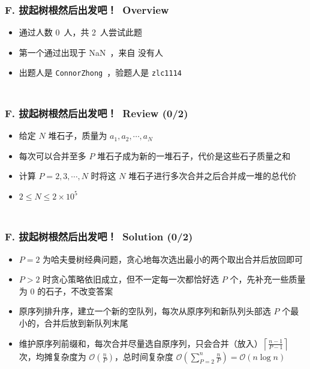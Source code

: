 \documentclass[notheorems]{beamer}
\newcommand{\zhProbF}{拔起树根然后出发吧！}\newcommand{\DiffF}{Medium}	\newcommand{\AuthProbF}{\texttt{ConnorZhong}}	\newcommand{\TestProbF}{\texttt{zlc1114}}
\newcommand{\TBD}{NaN}	\newcommand{\NONE}{没有人}	\newcommand{\INF}{$\infty$} \newcommand{\Someone}{佚名}
\newcommand{\AccInProbF}{0}	\newcommand{\SubInProbF}{2}	\newcommand{\RatInProbF}{00.00\%}
\newcommand{\FirPenInProbF}{\TBD}		\newcommand{\FirPerInProbF}{\NONE}
\begin{document}
\begin{frame}[label = ProbF]
\frametitle{\\ F. \zhProbF\ Overview}
\begin{spacing}{2.0} \large
\begin{itemize}
\item 通过人数 \AccInProbF\ 人，共 \SubInProbF\ 人尝试此题
\item 第一个通过出现于 \FirPenInProbF\ ，来自 \FirPerInProbF\ 
\item 出题人是 \AuthProbF\ ，验题人是 \TestProbF\
\end{itemize}
\end{spacing}
\end{frame}
\begin{frame}
\frametitle{\\ F. \zhProbF\ Review (\AccInProbF/\SubInProbF)}
\begin{spacing}{2.0} \large
\begin{itemize}
\item 给定 $N$ 堆石子，质量为 $a_1, a_2, \cdots, a_N$
\item 每次可以合并至多 $P$ 堆石子成为新的一堆石子，代价是这些石子质量之和
\item 计算 $P = 2, 3, \cdots, N$ 时将这 $N$ 堆石子进行多次合并之后合并成一堆的总代价
\item $2 \leq N \leq 2 \times 10^5$
\end{itemize}
\end{spacing}
\end{frame}
\begin{frame}
\frametitle{\\ F. \zhProbF\ Solution (\AccInProbF/\SubInProbF)}
\begin{spacing}{1.5} \large
\begin{itemize}[<+->]
\item $P = 2$ 为哈夫曼树经典问题，贪心地每次选出最小的两个取出合并后放回即可
\item $P > 2$ 时贪心策略依旧成立，但不一定每一次都恰好选 $P$ 个，先补充一些质量为 $0$ 的石子，不改变答案
\item 原序列排升序，建立一个新的空队列，每次从原序列和新队列头部选 $P$ 个最小的，合并后放到新队列末尾
\item 维护原序列前缀和，每次合并尽量选自原序列，只会合并（放入）$\left\lceil\frac{n - 1}{P - 1}\right\rceil$ 次，均摊复杂度为 $\mathcal{O}(\frac{n}{P})$，总时间复杂度 $\mathcal{O}(\sum_{P = 2}^{n}{\frac{n}{P}}) = \mathcal{O}(n \log n)$
\end{itemize}
\end{spacing}
\end{frame}
\end{document}

